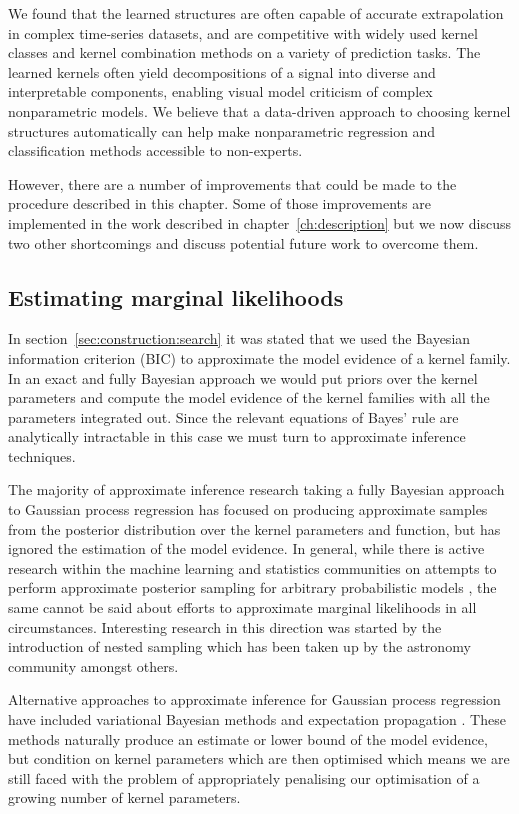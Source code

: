 We found that the learned structures are often capable of accurate extrapolation in complex time-series datasets, and are competitive with widely used kernel classes and kernel combination methods on a variety of prediction tasks.
The learned kernels often yield decompositions of a signal into diverse and interpretable components, enabling visual model criticism of complex nonparametric models.
We believe that a data-driven approach to choosing kernel structures automatically can help make nonparametric regression and classification methods accessible to non-experts.

However, there are a number of improvements that could be made to the procedure described in this chapter.
Some of those improvements are implemented in the work described in chapter~\ref{ch:description} but we now discuss two other shortcomings and discuss potential future work to overcome them.

\subsection{Estimating marginal likelihoods}

In section~\ref{sec:construction:search} it was stated that we used the Bayesian information criterion (BIC) to approximate the model evidence of a kernel family.
In an exact and fully Bayesian approach we would put priors over the kernel parameters and compute the model evidence of the kernel families with all the parameters integrated out.
Since the relevant equations of Bayes' rule are analytically intractable in this case we must turn to approximate inference techniques.

The majority of approximate inference research taking a fully Bayesian approach to Gaussian process regression has focused on producing approximate samples from the posterior distribution  over the kernel parameters and function, but has ignored the estimation of the model evidence.
In general, while there is active research within the machine learning and statistics communities on attempts to perform approximate posterior sampling for arbitrary probabilistic models , the same cannot be said about efforts to approximate marginal likelihoods in all circumstances.
Interesting research in this direction was started by the introduction of nested sampling  which has been taken up by the astronomy  community amongst others.

Alternative approaches to approximate inference for Gaussian process regression have included variational Bayesian methods  and expectation propagation .
These methods naturally produce an estimate or lower bound of the model evidence, but condition on kernel parameters which are then optimised which means we are still faced with the problem of appropriately penalising our optimisation of a growing number of kernel parameters.

